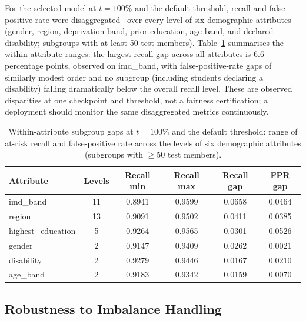 \documentclass[conference]{IEEEtran}
\begin{document}
For the selected model at $t=100\%$ and the default threshold, recall and
false-positive rate were disaggregated~\cite{mehrabi2021} over every level
of six demographic attributes (gender, region, deprivation band, prior education, age band,
and declared disability; subgroups with at least 50 test members).
Table~\ref{tab:fairness} summarises the within-attribute ranges: the
largest recall gap across all attributes is 6.6
percentage points, observed on imd\_band, with
false-positive-rate gaps of similarly modest order and no subgroup
(including students declaring a disability) falling dramatically below the
overall recall level. These are observed disparities at one checkpoint and
threshold, not a fairness certification; a deployment should monitor the
same disaggregated metrics continuously.

\begin{table}[t]
\centering
\caption{Within-attribute subgroup gaps at $t=100\%$ and the default
threshold: range of at-risk recall and false-positive rate across the
levels of six demographic attributes (subgroups with $\geq 50$ test
members).}
\label{tab:fairness}
\footnotesize
\begin{tabular}{lccccc}
\toprule
\textbf{Attribute} & \textbf{Levels} & \textbf{Recall min} & \textbf{Recall max} & \textbf{Recall gap} & \textbf{FPR gap} \\
\midrule
imd\_band & 11 & 0.8941 & 0.9599 & 0.0658 & 0.0464 \\
region & 13 & 0.9091 & 0.9502 & 0.0411 & 0.0385 \\
highest\_education & 5 & 0.9264 & 0.9565 & 0.0301 & 0.0526 \\
gender & 2 & 0.9147 & 0.9409 & 0.0262 & 0.0021 \\
disability & 2 & 0.9279 & 0.9446 & 0.0167 & 0.0210 \\
age\_band & 2 & 0.9183 & 0.9342 & 0.0159 & 0.0070 \\
\bottomrule
\end{tabular}
\end{table}

\subsection{Robustness to Imbalance Handling}
\end{document}
